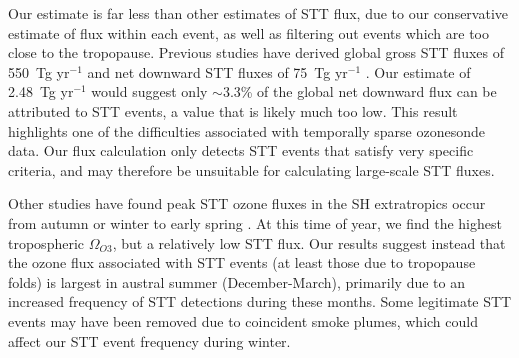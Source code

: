   Our estimate is far less than other estimates of STT flux, due to our conservative estimate of flux within each event, as well as filtering out events which are too close to the tropopause.
  Previous studies have derived global gross STT fluxes of 550~Tg yr$^{-1}$ \citep{Stevenson2006} and net downward STT fluxes of 75~Tg yr$^{-1}$ \citep{Sprenger2003}.
  Our estimate of 2.48~Tg yr$^{-1}$ would suggest only $\sim$3.3\% of the global net downward flux can be attributed to STT events, a value that is likely much too low.
  This result highlights one of the difficulties associated with temporally sparse ozonesonde data.
  Our flux calculation only detects STT events that satisfy very specific criteria, and may therefore be unsuitable for calculating large-scale STT fluxes.
  
  Other studies have found peak STT ozone fluxes in the SH extratropics occur from autumn or winter to early spring \citep{Olsen2003, Liu2016}. 
  At this time of year, we find the highest tropospheric $\Omega_{O3}$, but a relatively low STT flux.
  Our results suggest instead that the ozone flux associated with STT events (at least those due to tropopause folds) is largest in austral summer (December-March), primarily due to an increased frequency of STT detections during these months.
  Some legitimate STT events may have been removed due to coincident smoke plumes, which could affect our STT event frequency during winter.
  

